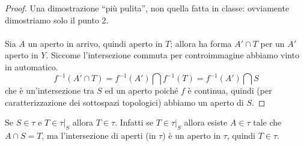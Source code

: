 \begin{proof}
	Una dimostrazione \enquote{più pulita}, non quella fatta in classe: ovviamente dimostriamo solo il punto $2$.\\ \\
	Sia $A$ un aperto in arrivo, quindi aperto in $T$; allora ha forma $A' \cap T$ per un $A'$ aperto in $Y$.  Siccome l'intersezione commuta per controimmagine abbiamo vinto in automatico.
	\begin{equation*}
	f^{-1}\left(A' \cap T\right)=f^{-1}\left(A'\right) \bigcap f^{-1}\left(T\right) = f^{-1}\left(A'\right) \bigcap S 
	\end{equation*}
	che è un'intersezione tra $S$ ed un aperto poiché $f$ è continua, quindi (per caratterizzazione dei sottospazi topologici) abbiamo un aperto di $S$.
\end{proof}

\begin{remark}
	Se $S \in \tau$ e $T \in \tau|_S$ allora $T \in \tau$. Infatti se $T \in \tau|_S$ allora esiste $A \in \tau$ tale che $A \cap S = T$, ma l'intersezione di aperti (in $\tau$) è un aperto in $\tau$, quindi $T \in \tau$.
\end{remark}

